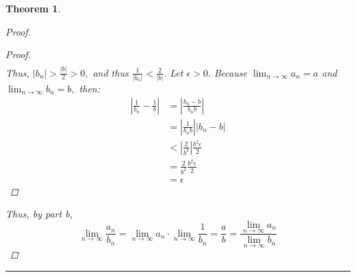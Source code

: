 \documentclass[openany, amssymb, psamsfonts]{amsart}
\newtheorem{thm}{Theorem}[section]
\theoremstyle{definition}
\numberwithin{equation}{section}
\begin{document}
\begin{thm}
\begin{enumerate}[(a)]
\begin{proof}
\begin{proof}
\begin{align*}
\end{align*}
Thus, $|b_n|> \frac{|b|}{2}>0,$ and thus $\frac{1}{|b_n|}< \frac{2}{|b|}.$
Let $\epsilon>0.$ Because $\displaystyle\lim_{n\to \infty} a_n = a$ and $\displaystyle\lim_{n\to \infty}b_n = b,$ then:
\begin{align*}
|\frac{1}{b_n}  - \frac{1}{b}| &= |\frac{b_n - b}{b_nb}|\\
&= |\frac{1}{b_nb}||b_n-b|\\
&<|\frac{2}{b^2}|\frac{b^2 \epsilon}{2}\\
&= \frac{2}{b^2}\frac{b^2 \epsilon}{2}\\
&= \epsilon
\end{align*}
\end{proof}
Thus, by part b, \[\displaystyle\lim_{n\to \infty}\frac{a_n}{b_n} = \displaystyle\lim_{n\to \infty}a_n \cdot \displaystyle\lim_{n\to \infty}\frac{1}{b_n} = \frac{a}{b} = \frac{\displaystyle\lim_{n\to \infty}a_n}{\displaystyle\lim_{n\to \infty}b_n}\]
 \end{proof}\vspace{4pt}     \hrule   \vspace{4pt}
\end{enumerate}

\end{thm}
\end{document}
